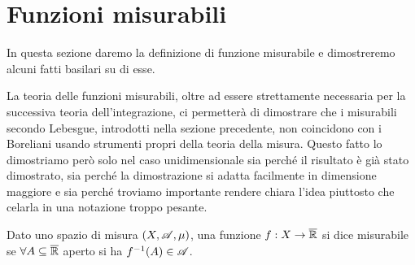 \section{Funzioni misurabili}
In questa sezione daremo la definizione di funzione misurabile e dimostreremo alcuni fatti basilari su di esse.

La teoria delle funzioni misurabili, oltre ad essere strettamente necessaria per la successiva teoria dell'integrazione, ci permetterà di dimostrare che i misurabili secondo Lebesgue, introdotti nella sezione precedente, non coincidono con i Boreliani usando strumenti propri della teoria della misura.
Questo fatto lo dimostriamo però solo nel caso unidimensionale sia perché il risultato è già stato dimostrato, sia perché la dimostrazione si adatta facilmente in dimensione maggiore e sia perché troviamo importante rendere chiara l'idea piuttosto che celarla in una notazione troppo pesante.

\begin{definition}
	Dato uno spazio di misura $(X,\mathscr A,\mu)$, una funzione $f:X\rightarrow \overline{\mathbb R}$ si dice misurabile se
	$\forall A \subseteq \overline{\mathbb R}$ aperto si ha $f^{-1}(A)\in \mathscr A$.
\end{definition}

